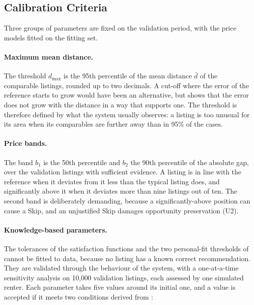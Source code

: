 \documentclass[12pt,a4paper]{report}
\begin{document}
\subsection{Calibration Criteria}
\label{sec:calibration-criteria}

Three groups of parameters are fixed on the validation period, with the
price models fitted on the fitting set.

\paragraph{Maximum mean distance.} The threshold $d_{\max}$ is the 95th
percentile of the mean distance $\bar{d}$ of the comparable listings,
rounded up to two decimals. A cut-off where the error of the reference starts
to grow would have been an alternative, but  shows
that the error does not grow with the distance in a way that supports one.
The threshold is therefore defined by what the system usually observes: a
listing is too unusual for its area when its comparables are further away
than in 95\% of the cases.

\paragraph{Price bands.} The band $b_1$ is the 50th percentile and $b_2$ the
90th percentile of the absolute gap, over the validation listings with
sufficient evidence. A listing is in line with the reference when it
deviates from it less than the typical listing does, and significantly above
it when it deviates more than nine listings out of ten. The second band is
deliberately demanding, because a significantly-above position can cause a
Skip, and an unjustified Skip damages opportunity preservation (U2).

\paragraph{Knowledge-based parameters.} The tolerances of the satisfaction
functions and the two personal-fit thresholds of 
cannot be fitted to data, because no listing has a known correct
recommendation. They are validated through the behaviour of the system,
with a one-at-a-time sensitivity analysis on 10,000 validation listings,
each assessed by one simulated renter. Each parameter takes five values
around its initial one, and a value is accepted if it meets two conditions
derived from :
\end{document}
